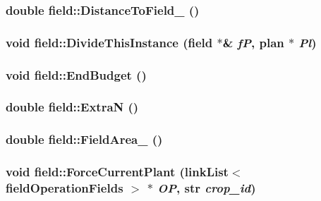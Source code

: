 \label{classfield_a5c05b940e58b24dae910654ee8a4eca0}
\hypertarget{classfield_aab17aa694538578ace4f6fc40cc561fc}{
\subsubsection[{DistanceToField\_\-}]{\setlength{\rightskip}{0pt plus 5cm}double field::DistanceToField\_\- ()}}
\label{classfield_aab17aa694538578ace4f6fc40cc561fc}
\hypertarget{classfield_ad2d1131c9c208b90868ab13d9f87ceed}{
\subsubsection[{DivideThisInstance}]{\setlength{\rightskip}{0pt plus 5cm}void field::DivideThisInstance ({\bf field} $\ast$\& {\em fP}, \/  {\bf plan} $\ast$ {\em Pl})}}
\label{classfield_ad2d1131c9c208b90868ab13d9f87ceed}
\hypertarget{classfield_a16113f10f06008c8c9c9e117b568b98f}{
\subsubsection[{EndBudget}]{\setlength{\rightskip}{0pt plus 5cm}void field::EndBudget ()}}
\label{classfield_a16113f10f06008c8c9c9e117b568b98f}
\hypertarget{classfield_aa626fa3770c1d155456d6d51e3a382a8}{
\subsubsection[{ExtraN}]{\setlength{\rightskip}{0pt plus 5cm}double field::ExtraN ()}}
\label{classfield_aa626fa3770c1d155456d6d51e3a382a8}
\hypertarget{classfield_a06bf7fac158821737ac02588c50008a2}{
\subsubsection[{FieldArea\_\-}]{\setlength{\rightskip}{0pt plus 5cm}double field::FieldArea\_\- ()}}
\label{classfield_a06bf7fac158821737ac02588c50008a2}
\hypertarget{classfield_a025a74a5935f44df084705be722fb0da}{
\subsubsection[{ForceCurrentPlant}]{\setlength{\rightskip}{0pt plus 5cm}void field::ForceCurrentPlant ({\bf linkList}$<$ {\bf fieldOperationFields} $>$ $\ast$ {\em OP}, \/  {\bf str} {\em crop\_\-id})}}
